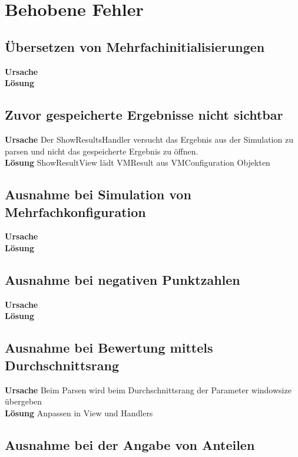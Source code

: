 \section{Behobene Fehler}

\subsection{Übersetzen von Mehrfachinitialisierungen}

\textbf{Ursache}\\
\textbf{Lösung}

\subsection{Zuvor gespeicherte Ergebnisse nicht sichtbar}

\textbf{Ursache} Der ShowResultsHandler versucht das Ergebnis aus der Simulation zu parsen und nicht das gespeicherte Ergebnis zu öffnen.\\
\textbf{Lösung} ShowResultView lädt VMResult aus VMConfiguration Objekten

\subsection{Ausnahme bei Simulation von Mehrfachkonfiguration}

\textbf{Ursache}\\
\textbf{Lösung}

\subsection{Ausnahme bei negativen Punktzahlen}

\textbf{Ursache}\\
\textbf{Lösung}

\subsection{Ausnahme bei Bewertung mittels Durchschnittsrang}

\textbf{Ursache} Beim Parsen wird beim Durchschnittsrang der Parameter windowsize übergeben\\
\textbf{Lösung} Anpassen in View und Handlers

\subsection{Ausnahme bei der Angabe von Anteilen}

